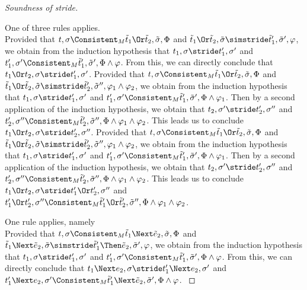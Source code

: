 \begin{proof}[Soundness of stride]
{{   }
 }

 {
One of three rules applies.\\
   {Provided that $t,\sigma\Consistent_M\tilde{t}_1\Or \tilde{t}_2,\tilde{\sigma},\Phi$
   and $\tilde{t}_1\Or \tilde{t}_2,\tilde{\sigma}\simstride\tilde{t}'_1,\tilde{\sigma}',\phi$,
   we obtain from the induction hypothesis that $t_1,\sigma\stride t_1',\sigma'$ and $t_1',\sigma'\Consistent_M\tilde{t}_1',\tilde{\sigma}',\Phi\land\phi$.
   From this, we can directly conclude that $t_1\Or t_2,\sigma\stride t_1',\sigma'$.
  }
   { Provided that $t,\sigma\Consistent_M\tilde{t}_1\Or \tilde{t}_2,\tilde{\sigma},\Phi$
   and $\tilde{t}_1\Or \tilde{t}_2,\tilde{\sigma}\simstride\tilde{t}'_2,\tilde{\sigma}'',\phi_1\land\phi_2$,
   we obtain from the induction hypothesis that $t_1,\sigma\stride t_1',\sigma'$ and $t_1',\sigma'\Consistent_M\tilde{t}_1',\tilde{\sigma}',\Phi\land\phi_1$.
   Then by a second application of the induction hypothesis, we obtain that $t_2,\sigma'\stride t_2',\sigma''$ and $t_2',\sigma''\Consistent_M\tilde{t}_2',\tilde{\sigma}'',\Phi\land\phi_1\land\phi_2$.
   This leads us to conclude $t_1\Or t_2,\sigma\stride t_2',\sigma''$.
   }
  {  Provided that $t,\sigma\Consistent_M\tilde{t}_1\Or \tilde{t}_2,\tilde{\sigma},\Phi$
  and $\tilde{t}_1\Or \tilde{t}_2,\tilde{\sigma}\simstride\tilde{t}'_2,\tilde{\sigma}'',\phi_1\land\phi_2$,
  we obtain from the induction hypothesis that $t_1,\sigma\stride t_1',\sigma'$ and $t_1',\sigma'\Consistent_M\tilde{t}_1',\tilde{\sigma}',\Phi\land\phi_1$.
  Then by a second application of the induction hypothesis, we obtain that $t_2,\sigma'\stride t_2',\sigma''$ and $t_2',\sigma''\Consistent_M\tilde{t}_2',\tilde{\sigma}'',\Phi\land\phi_1\land\phi_2$.
  This leads us to conclude $t_1\Or t_2,\sigma\stride t_1'\Or t_2',\sigma''$ and $t_1'\Or t_2',\sigma''\Consistent_M\tilde{t}_1'\Or\tilde{t}_2',\tilde{\sigma}'',\Phi\land\phi_1\land\phi_2$.
   }
 }

 {One rule applies, namely \\
 Provided that $t,\sigma\Consistent_M\tilde{t}_1\Next \tilde{e}_2,\tilde{\sigma},\Phi$
 and $\tilde{t}_1\Next \tilde{e}_2,\tilde{\sigma}\simstride\tilde{t}'_1\Then \tilde{e}_2,\tilde{\sigma}',\phi$,
 we obtain from the induction hypothesis that $t_1,\sigma\stride t_1',\sigma'$ and $t_1',\sigma'\Consistent_M\tilde{t}_1',\tilde{\sigma}',\Phi\land\phi$.
 From this, we can directly conclude that $t_1\Next e_2,\sigma\stride t_1'\Next e_2,\sigma'$ and $t_1'\Next e_2,\sigma'\Consistent_M\tilde{t}_1'\Next\tilde{e}_2,\tilde{\sigma}',\Phi\land\phi$.
}


\end{proof}
